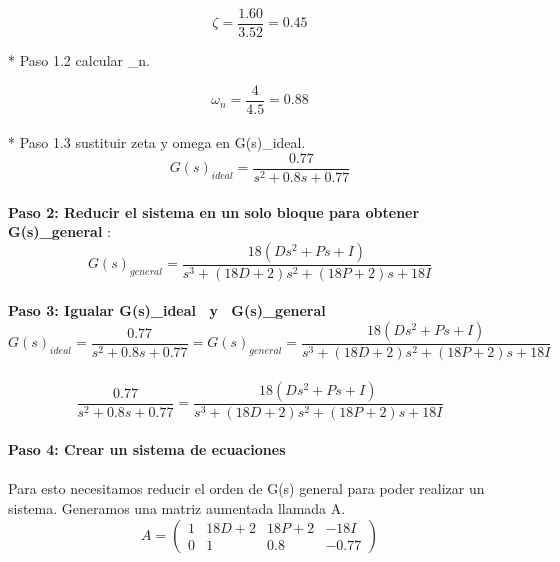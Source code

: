 \documentclass[12pt,letterpaper]{article}
\begin{document}
\begin{equation}\zeta=\frac{1.60}{3.52} = 0.45\end{equation} 

* Paso 1.2 calcular \omega_{n}. 

\begin{equation}\omega_{n}=\frac{4}{4.5}=0.88\end{equation}  \\

* Paso 1.3 sustituir zeta y omega en G(s)_{ideal}. \\ 

\begin{equation}G(s)_{ideal}=\frac{0.77}{s^{2}+0.8s+0.77}\end{equation} \\ 

\textbf{Paso 2: Reducir el sistema en un solo bloque para obtener G(s)_{general} }: \\

\begin{equation}G(s)_{general} =  \frac{18(Ds^{2}+Ps+I)}{s^{3}+(18D+2)s^{2}+(18P+2)s+18I}\end{equation} \\ 

\textbf{Paso 3: Igualar  {G(s)_{ideal} \ y \ G(s)_{general}} } \\ 

\begin{equation}G(s)_{ideal}=\frac{0.77}{s^{2}+0.8s+0.77} = G(s)_{general} =  \frac{18(Ds^{2}+Ps+I)}{s^{3}+(18D+2)s^{2}+(18P+2)s+18I} \end{equation} \\ 

\begin{equation}
    \frac{0.77}{s^{2}+0.8s+0.77} = \frac{18(Ds^{2}+Ps+I)}{s^{3}+(18D+2)s^{2}+(18P+2)s+18I} 
\end{equation}\\ 



\textbf{Paso 4: Crear un sistema de ecuaciones } \\ \\ 

Para esto necesitamos reducir el orden de G(s) general para poder realizar un sistema. Generamos una matriz aumentada llamada A. \\ 


\begin{equation}A =\left(\begin{array}{ccc|c}
1 & 18 D+2 & 18P+2 & -18 I \\
0 & 1 & 0.8 & -0.77
\end{array}\right)\end{equation} \\ 
\end{document}
